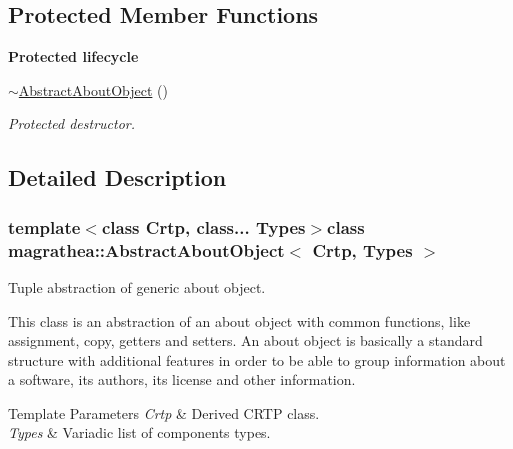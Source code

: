\subsection*{Protected Member Functions}
\begin{Indent}{\bf Protected lifecycle}\par
\begin{DoxyCompactItemize}
\item 
\hyperlink{classmagrathea_1_1AbstractAboutObject_a973340acc227da7ea414b2d8da227fa5}{$\sim$\-Abstract\-About\-Object} ()
\begin{DoxyCompactList}\small\item\em Protected destructor. \end{DoxyCompactList}\end{DoxyCompactItemize}
\end{Indent}


\subsection{Detailed Description}
\subsubsection*{template$<$class Crtp, class... Types$>$class magrathea\-::\-Abstract\-About\-Object$<$ Crtp, Types $>$}

Tuple abstraction of generic about object. 

This class is an abstraction of an about object with common functions, like assignment, copy, getters and setters. An about object is basically a standard structure with additional features in order to be able to group information about a software, its authors, its license and other information. 
\begin{DoxyTemplParams}{Template Parameters}
{\em Crtp} & Derived C\-R\-T\-P class. \\
\hline
{\em Types} & Variadic list of components types. \\
\hline
\end{DoxyTemplParams}


